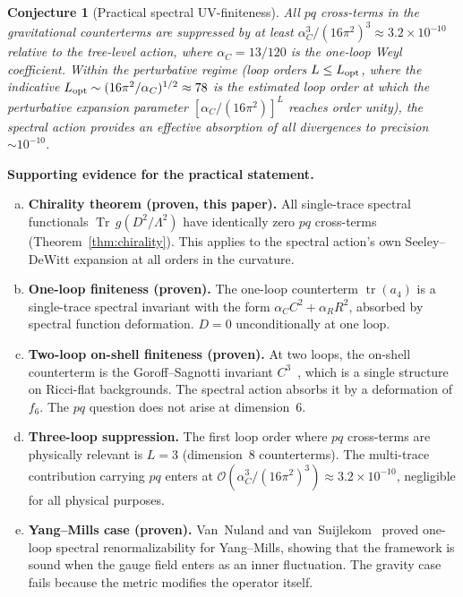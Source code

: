 \documentclass[12pt,a4paper]{article}
\newtheorem{conjecture}[theorem]{Conjecture}
\theoremstyle{definition}
\theoremstyle{remark}
\newcommand{\Tr}{\operatorname{Tr}}
\newcommand{\tr}{\operatorname{tr}}
\newcommand{\Lam}{\Lambda}
\newcommand{\order}{\mathcal{O}}
\begin{document}
\begin{conjecture}[Practical spectral UV-finiteness]
\label{conj:practical}
All $pq$ cross-terms in the gravitational counterterms are suppressed by at
least $\alpha_C^3/(16\pi^2)^3 \approx 3.2 \times 10^{-10}$ relative to
the tree-level action, where $\alpha_C = 13/120$ is the one-loop Weyl
coefficient.  Within the perturbative regime (loop orders
$L \leq L_{\rm opt}$, where the indicative $L_{\rm opt} \sim (16\pi^2/\alpha_C)^{1/2}
\approx 78$ is the estimated loop order at which the perturbative expansion parameter
$[\alpha_C/(16\pi^2)]^L$ reaches order unity), the spectral action provides
an effective absorption of all divergences to precision $\sim 10^{-10}$.
\end{conjecture}

\noindent\textbf{Supporting evidence for the practical statement.}
\begin{enumerate}[(a)]
  \item \textbf{Chirality theorem (proven, this paper).}
    All single-trace spectral functionals $\Tr\,g(D^2/\Lam^2)$ have
    identically zero $pq$ cross-terms (Theorem~\ref{thm:chirality}).
    This applies to the spectral action's own Seeley--DeWitt expansion
    at all orders in the curvature.

  \item \textbf{One-loop finiteness (proven).}
    The one-loop counterterm $\tr(a_4)$ is a single-trace spectral
    invariant with the form $\alpha_C C^2 + \alpha_R R^2$, absorbed
    by spectral function deformation.  $D = 0$ unconditionally at
    one loop.

  \item \textbf{Two-loop on-shell finiteness (proven).}
    At two loops, the on-shell counterterm is the Goroff--Sagnotti
    invariant $C^3$~\cite{Goroff:1985th,vandeVen:1992gw}, which is a single
    structure on Ricci-flat backgrounds.  The spectral action absorbs it by
    a deformation of $f_6$.  The $pq$ question does not arise at dimension~6.

  \item \textbf{Three-loop suppression.}
    The first loop order where $pq$ cross-terms are physically relevant is
    $L = 3$ (dimension~8 counterterms).  The multi-trace contribution
    carrying $pq$ enters at $\order(\alpha_C^3/(16\pi^2)^3) \approx
    3.2 \times 10^{-10}$, negligible for all physical purposes.

  \item \textbf{Yang--Mills case (proven).}
    Van~Nuland and van~Suijlekom~\cite{vanNuland:2021} proved one-loop
    spectral renormalizability for Yang--Mills, showing that the framework is
    sound when the gauge field enters as an inner fluctuation.  The gravity
    case fails because the metric modifies the operator itself.
\end{enumerate}
\end{document}
